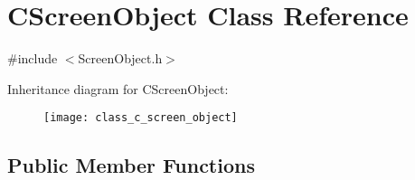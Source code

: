 \hypertarget{class_c_screen_object}{}\section{C\+Screen\+Object Class Reference}
\label{class_c_screen_object}


{\ttfamily \#include $<$Screen\+Object.\+h$>$}

Inheritance diagram for C\+Screen\+Object\+:\begin{figure}[H]
\begin{center}
\leavevmode
\texttt{[image: class\_c\_screen\_object]}
\end{center}
\end{figure}
\subsection*{Public Member Functions}
